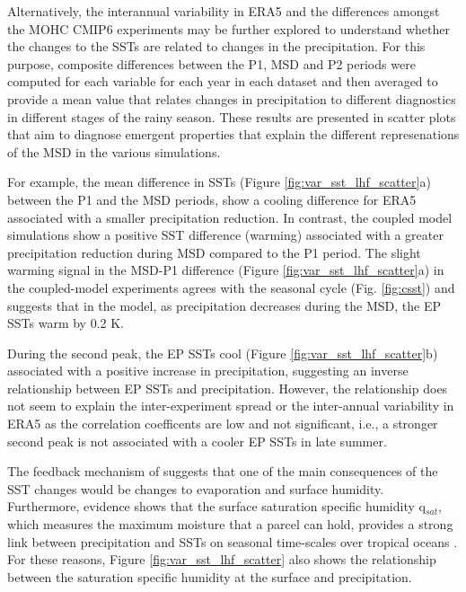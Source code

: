 Alternatively, the interannual variability in ERA5 and the differences amongst the MOHC CMIP6 experiments may be further explored to understand whether the changes to the SSTs are related to changes in the precipitation. For this purpose, composite differences between the P1, MSD and P2 periods were computed for each variable for each year in each dataset and then averaged to provide a mean value that relates changes in precipitation to different diagnostics in different stages of the rainy season.  These results are presented in scatter plots that aim to diagnose emergent properties that explain the different represenations of the MSD in the various simulations. %

For example, the mean difference in SSTs (Figure \ref{fig:var_sst_lhf_scatter}a) between the P1 and the MSD periods, show a cooling difference for ERA5 associated with a smaller precipitation reduction. In contrast, the coupled model simulations show a positive SST difference (warming) associated with a greater precipitation reduction during MSD compared to the P1 period.
The slight warming signal in the MSD-P1 difference (Figure \ref{fig:var_sst_lhf_scatter}a) in the coupled-model experiments agrees with the seasonal cycle (Fig. \ref{fig:csst}) and suggests that in the model, as precipitation decreases during the MSD, the EP SSTs warm by 0.2 K. 

During the second peak, the EP SSTs cool (Figure \ref{fig:var_sst_lhf_scatter}b) associated with a positive increase in precipitation, suggesting an inverse relationship between EP SSTs and precipitation. However, the relationship does not seem to explain the inter-experiment spread or the inter-annual variability in ERA5 as the correlation coefficents are low and not significant, i.e., a stronger second peak is not associated with a cooler EP SSTs in late summer. 

The feedback mechanism of \cite{magana1999} suggests that one of the main consequences of the SST changes would be changes to evaporation and surface humidity. Furthermore, evidence shows that the surface saturation specific humidity q$_{sat}$, which measures the maximum moisture that a parcel can hold, provides a strong link between precipitation and SSTs on seasonal time-scales over tropical oceans \citep{yang2019,good2021}. For these reasons, Figure \ref{fig:var_sst_lhf_scatter} also shows the relationship between the saturation specific humidity at the surface and precipitation. 

